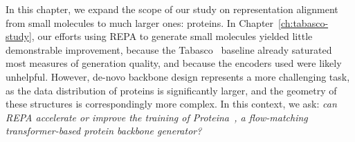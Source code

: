 \documentclass[12pt,a4paper,twoside]{report}
\begin{document}

In this chapter, we expand the scope of our study on representation alignment from small molecules to much larger ones: proteins. In Chapter~\ref{ch:tabasco-study}, our efforts using REPA to generate small molecules yielded little demonstrable improvement, because the Tabasco~\cite{Tabasco} baseline already saturated most measures of generation quality, and because the encoders used were likely unhelpful. However, de-novo backbone design represents a more challenging task, as the data distribution of proteins is significantly larger, and the geometry of these structures is correspondingly more complex. In this context, we ask: \emph{can REPA accelerate or improve the training of Proteina~\cite{Proteina}, a flow-matching transformer-based protein backbone generator?}
\end{document}

